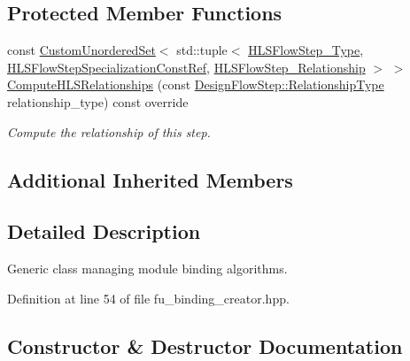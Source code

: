 \subsection*{Protected Member Functions}
\begin{DoxyCompactItemize}
\item 
const \hyperlink{classCustomUnorderedSet}{Custom\+Unordered\+Set}$<$ std\+::tuple$<$ \hyperlink{hls__step_8hpp_ada16bc22905016180e26fc7e39537f8d}{H\+L\+S\+Flow\+Step\+\_\+\+Type}, \hyperlink{hls__step_8hpp_a5fdd2edf290c196531d21d68e13f0e74}{H\+L\+S\+Flow\+Step\+Specialization\+Const\+Ref}, \hyperlink{hls__step_8hpp_a3ad360b9b11e6bf0683d5562a0ceb169}{H\+L\+S\+Flow\+Step\+\_\+\+Relationship} $>$ $>$ \hyperlink{classfu__binding__creator_a9eb82db43be34dd0e60d85394c9e2f72}{Compute\+H\+L\+S\+Relationships} (const \hyperlink{classDesignFlowStep_a723a3baf19ff2ceb77bc13e099d0b1b7}{Design\+Flow\+Step\+::\+Relationship\+Type} relationship\+\_\+type) const override
\begin{DoxyCompactList}\small\item\em Compute the relationship of this step. \end{DoxyCompactList}\end{DoxyCompactItemize}
\subsection*{Additional Inherited Members}


\subsection{Detailed Description}
Generic class managing module binding algorithms. 

Definition at line 54 of file fu\+\_\+binding\+\_\+creator.\+hpp.



\subsection{Constructor \& Destructor Documentation}
\mbox{\label{classfu__binding__creator_aec180b9caaba0f0d3835564106dd690e}} 
